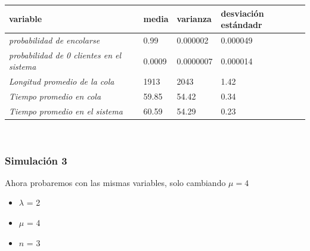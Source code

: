 \documentclass[11pt]{article}
\begin{document}
    \begin{table}[h]
\begin{tabular}{|l|l|l|l|}
\hline
\textbf{variable}                                 & \textbf{media} & \textbf{varianza} & \textbf{desviación estándadr} \\ \hline
\textit{probabilidad de encolarse}                & 0.99          & 0.000002             & 0.000049                    \\ \hline
\textit{probabilidad de 0 clientes en el sistema} & 0.0009         & 0.0000007            & 0.000014                        \\ \hline
\textit{Longitud promedio de la cola}             & 1913            & 2043              & 1.42                           \\ \hline
\textit{Tiempo promedio en cola}                  & 59.85           & 54.42            & 0.34                       \\ \hline
\textit{Tiempo promedio en el sistema}            & 60.59           & 54.29             & 0.23                      \\ \hline
\end{tabular}
\end{table}\\

    \newpage
\subsubsection{Simulación 3}
    Ahora probaremos con las mismas variables, solo cambiando $\mu = 4$ \\
    \begin{itemize}
        \item $\lambda$ = 2
        \item $\mu$ = 4
        \item $n$ = 3
    \end{itemize} \\
\end{document}
